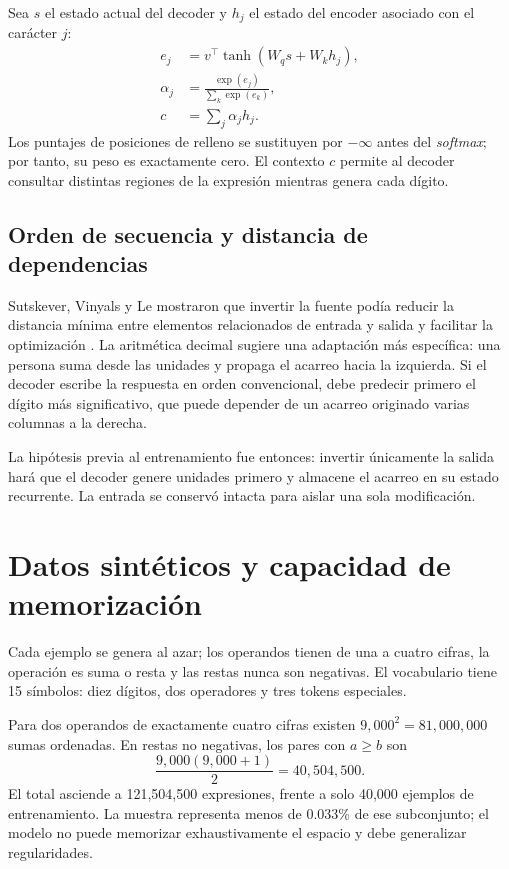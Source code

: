 \documentclass[11pt,letterpaper]{article}
\begin{document}
Sea $s$ el estado actual del decoder y $h_j$ el estado del encoder asociado con el carácter $j$:
\begin{align}
e_j &= v^\top \tanh(W_qs+W_kh_j),\\
\alpha_j &= \frac{\exp(e_j)}{\sum_k\exp(e_k)},\\
c &= \sum_j\alpha_jh_j.
\end{align}
Los puntajes de posiciones de relleno se sustituyen por $-\infty$ antes del \emph{softmax}; por tanto,
su peso es exactamente cero. El contexto $c$ permite al decoder consultar distintas regiones de la
expresión mientras genera cada dígito.

\subsection{Orden de secuencia y distancia de dependencias}

Sutskever, Vinyals y Le mostraron que invertir la fuente podía reducir la distancia mínima entre elementos
relacionados de entrada y salida y facilitar la optimización \cite{sutskever2014}. La aritmética decimal
sugiere una adaptación más específica: una persona suma desde las unidades y propaga el acarreo hacia la
izquierda. Si el decoder escribe la respuesta en orden convencional, debe predecir primero el dígito más
significativo, que puede depender de un acarreo originado varias columnas a la derecha.

La hipótesis previa al entrenamiento fue entonces: invertir únicamente la salida hará que el decoder genere
unidades primero y almacene el acarreo en su estado recurrente. La entrada se conservó intacta para aislar
una sola modificación.

\section{Datos sintéticos y capacidad de memorización}

Cada ejemplo se genera al azar; los operandos tienen de una a cuatro cifras, la operación es suma o resta
y las restas nunca son negativas. El vocabulario tiene 15 símbolos: diez dígitos, dos operadores y tres
tokens especiales.

Para dos operandos de exactamente cuatro cifras existen $9,000^2=81,000,000$ sumas ordenadas. En restas
no negativas, los pares con $a\geq b$ son
\[
\frac{9,000(9,000+1)}{2}=40,504,500.
\]
El total asciende a 121,504,500 expresiones, frente a solo 40,000 ejemplos de entrenamiento. La muestra
representa menos de 0.033\% de ese subconjunto; el modelo no puede memorizar exhaustivamente el espacio y
debe generalizar regularidades.
\end{document}
